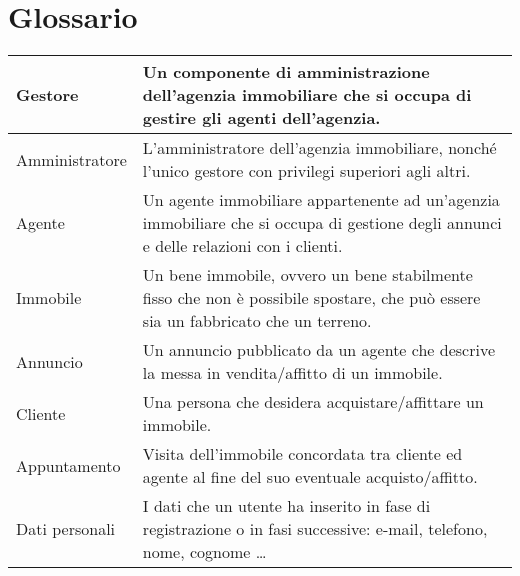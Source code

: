 \section{Glossario}
\begin{center}
\begin{tabular}{| m{8em} | m{8cm}|}
    \hline
    Gestore & Un componente di amministrazione dell'agenzia immobiliare 
    che si occupa di gestire gli agenti dell'agenzia. \\
    \hline
    Amministratore & L'amministratore dell'agenzia immobiliare, nonché 
    l'unico gestore con privilegi superiori agli altri.
    \\
    \hline
    Agente & Un agente immobiliare appartenente ad un'agenzia immobiliare 
    che si occupa di gestione degli annunci e delle relazioni con i clienti. \\
    \hline
    Immobile & Un bene immobile, ovvero un bene stabilmente fisso che non è 
    possibile spostare, che può essere sia un fabbricato che un terreno.\\
    \hline
    Annuncio & Un annuncio pubblicato da un agente che descrive la messa in 
    vendita/affitto di un immobile. \\
    \hline
    Cliente & Una persona che desidera acquistare/affittare un immobile.\\
    \hline
    Appuntamento & Visita dell'immobile concordata tra cliente ed agente al fine del 
    suo eventuale acquisto/affitto.\\
    \hline
    Dati personali & I dati che un utente ha inserito in fase di registrazione
    o in fasi successive: e-mail, telefono, nome, cognome \dots \\
    \hline

\end{tabular}
\end{center}